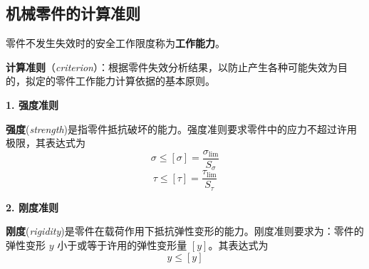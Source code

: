 \subsection{机械零件的计算准则}

\begin{definition}[工作能力]
\label{def:工作能力}
零件不发生失效时的安全工作限度称为\textbf{工作能力}。
\end{definition}

\begin{definition}[计算准则]
\label{def:计算准则}
\textbf{计算准则}（\emph{criterion}）：根据零件失效分析结果，以防止产生各种可能失效为目的，拟定的零件工作能力计算依据的基本原则。
\end{definition}

\textbf{1. 强度准则}

\begin{definition}[强度]
\label{def:强度}
\textbf{强度}(\emph{strength})是指零件抵抗破坏的能力。强度准则要求零件中的应力不超过许用极限，其表达式为
\begin{equation}
	\sigma \leq [\sigma]=\frac{\sigma_{\lim }}{S_{\sigma}}
	\label{eq:概论:正应力强度准则}
\end{equation}
\begin{equation}
	\tau \leq [\tau]=\frac{\tau_{\lim }}{S_{\tau}}
	\label{eq:概论:切应力强度准则}
\end{equation}
\end{definition}

\textbf{2. 刚度准则}

\begin{definition}[刚度]
\label{def:刚度}
\textbf{刚度}(\emph{rigidity})是零件在载荷作用下抵抗弹性变形的能力。刚度准则要求为：零件的弹性变形 $y$ 小于或等于许用的弹性变形量 $[y]$。其表达式为
\begin{equation}
	y \leq [y]
	\label{eq:概论:刚度准则}
\end{equation}
\end{definition}

